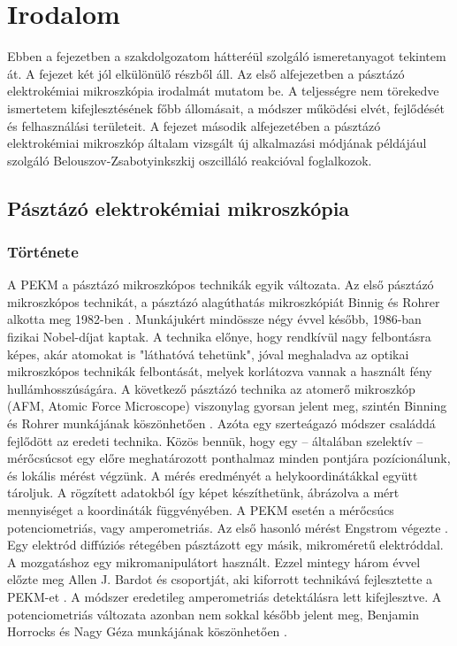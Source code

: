 \chapter{Irodalom}
\pagestyle{headings}

Ebben a fejezetben a szakdolgozatom hátteréül szolgáló ismeretanyagot tekintem át. A fejezet két jól elkülönülő részből áll. Az első alfejezetben a pásztázó elektrokémiai mikroszkópia irodalmát mutatom be. A teljességre nem törekedve ismertetem kifejlesztésének főbb állomásait, a módszer működési elvét, fejlődését és felhasználási területeit. A fejezet második alfejezetében a pásztázó elektrokémiai mikroszkóp általam vizsgált új alkalmazási módjának példájául szolgáló Belouszov-Zsabotyinkszkij oszcilláló reakcióval foglalkozok. 

\section{Pásztázó elektrokémiai mikroszkópia}




\subsection{Története}

A PEKM a pásztázó mikroszkópos technikák egyik változata. Az első pásztázó mikroszkópos technikát, a pásztázó alagúthatás mikroszkópiát Binnig és Rohrer alkotta meg 1982-ben \cite{binnig1982surface}. Munkájukért mindössze négy évvel később, 1986-ban fizikai Nobel-díjat kaptak. A technika előnye, hogy rendkívül nagy felbontásra képes, akár atomokat is "láthatóvá tehetünk", jóval meghaladva az optikai mikroszkópos technikák felbontását, melyek korlátozva vannak a használt fény hullámhosszúságára. A következő pásztázó technika az atomerő mikroszkóp (AFM, Atomic Force Microscope) viszonylag gyorsan jelent meg, szintén Binning és Rohrer munkájának köszönhetően \cite{binnig1986atomic, bennig1988atomic}. Azóta egy szerteágazó módszer családdá fejlődött az eredeti technika. Közös bennük, hogy egy -- általában szelektív -- mérőcsúcsot egy előre meghatározott ponthalmaz minden pontjára pozícionálunk, és lokális mérést végzünk. A mérés eredményét a helykoordinátákkal együtt tároljuk. A rögzített adatokból így képet készíthetünk, ábrázolva a mért mennyiséget a koordináták függvényében. A PEKM esetén a mérőcsúcs potenciometriás, vagy amperometriás. Az első hasonló mérést Engstrom végezte \cite{engstrom1986measurements}. Egy elektród diffúziós rétegében pásztázott egy másik, mikroméretű elektróddal. A mozgatáshoz egy mikromanipulátort használt. Ezzel mintegy három évvel előzte meg Allen J. Bardot és csoportját, aki kiforrott technikává fejlesztette a PEKM-et \cite{bard1989scanning}. A módszer eredetileg amperometriás detektálásra lett kifejlesztve. A potenciometriás változata azonban nem sokkal később jelent meg, Benjamin Horrocks és Nagy Géza munkájának köszönhetően \cite{horrocks1993scanning}.

